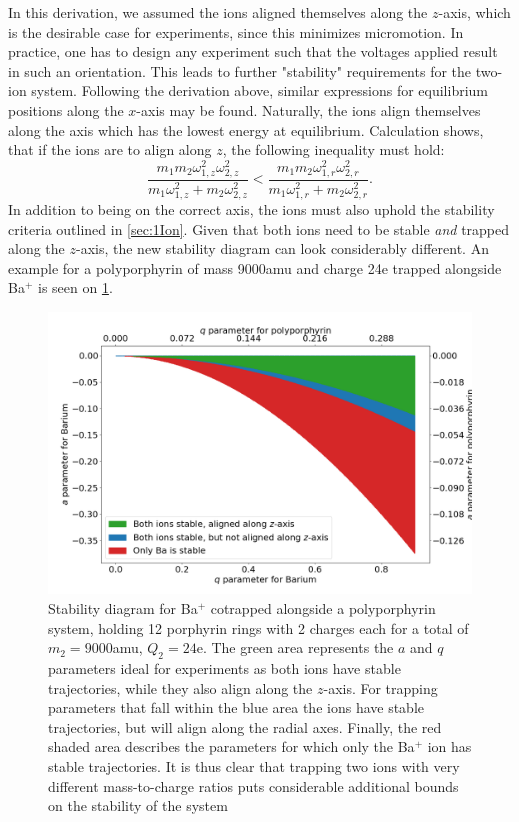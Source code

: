 In this derivation, we assumed the ions aligned themselves along the $z$-axis, which is the desirable case for experiments, since this minimizes micromotion. In practice, one has to design any experiment such that the voltages applied result in such an orientation. This leads to further "stability" requirements for the two-ion system.
Following the derivation above, similar expressions for equilibrium positions along the $x$-axis may be found. Naturally, the ions align themselves along the axis which has the lowest energy at equilibrium. Calculation shows, that if the ions are to align along $z$, the following inequality must hold:
\begin{equation}
    \frac{m_1m_2\omega_{1,z}^2\omega_{2,z}^2}{m_1\omega_{1,z}^2+m_2\omega_{2,z}^2} < \frac{m_1m_2\omega_{1,r}^2\omega_{2,r}^2}{m_1\omega_{1,r}^2+m_2\omega_{2,r}^2}.
\end{equation}
In addition to being on the correct axis, the ions must also uphold the stability criteria outlined in \cref{sec:1Ion}. Given that both ions need to be stable \textit{and} trapped along the $z$-axis, the new stability diagram can look considerably different. An example for a polyporphyrin of mass 9000amu and charge 24e trapped alongside Ba$^+$ is seen on \cref{fig:Stability2}.
\begin{figure}
    \centering
    \includegraphics[width = \textwidth]{main/Stability2.png}
    \caption{Stability diagram for Ba$^+$ cotrapped alongside a polyporphyrin system, holding 12 porphyrin rings with 2 charges each for a total of $m_2 = 9000$amu, $Q_2 = 24$e. The green area represents the $a$ and $q$ parameters ideal for experiments as both ions have stable trajectories, while they also align along the $z$-axis.
    For trapping parameters that fall within the blue area the ions have stable trajectories, but will align along the radial axes. Finally, the red shaded area describes the parameters for which only the Ba$^+$ ion has stable trajectories. It is thus clear that trapping two ions with very different mass-to-charge ratios puts considerable additional bounds on the stability of the system}
    \label{fig:Stability2}
\end{figure}


